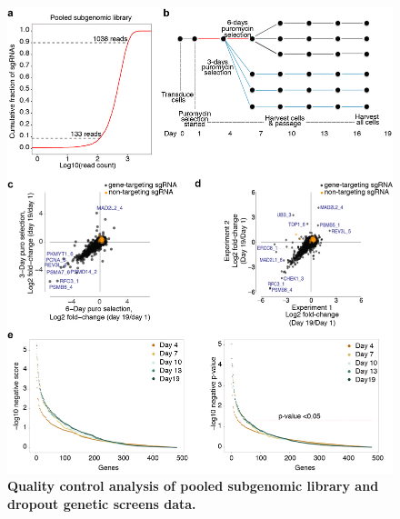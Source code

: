 

\renewcommand{\figurename}{Supplementary Figure}
\setcounter{figure}{0} 
\renewcommand{\tablename}{Supplementary Table}
\setcounter{table}{0}


\begin{figure}
    \centering
    \includegraphics[width=1\textwidth]{supplement/figures/pooled_screen}
    \caption[Quality control of dropout screens]
            {\small{\textbf{Quality control analysis of pooled subgenomic library and dropout genetic screens data.}}
            }
        \label{sfig:dropout-screen}
\end{figure}

